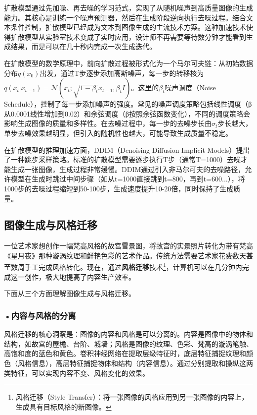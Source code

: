 扩散模型通过先加噪、再去噪的学习范式，实现了从随机噪声到高质量图像的生成能力。其核心是训练一个噪声预测器，然后在生成阶段逆向执行去噪过程。结合文本条件控制，扩散模型已经成为文本到图像生成的主流技术方案。这种加速技术使得扩散模型从实验室技术变成了实时应用，设计师不再需要等待数分钟才能看到生成结果，而是可以在几十秒内完成一次生成迭代。

在扩散模型的数学原理中，前向扩散过程被形式化为一个马尔可夫链：从初始数据分布$q(x_0)$出发，通过T步逐步添加高斯噪声，每一步的转移核为$q(x_t|x_{t-1}) = \mathcal{N}(x_t; \sqrt{1-\beta_t}x_{t-1}, \beta_t I)$。这里的$\beta_t$噪声调度（Noise Schedule），控制了每一步添加噪声的强度。常见的噪声调度策略包括线性调度（β从0.0001线性增加到0.02）和余弦调度（β按照余弦函数变化），不同的调度策略会影响生成图像的质量和多样性。在去噪过程中，每一步的去噪步长由$\sigma_t$步长越大，单步去噪效果越明显，但引入的随机性也越大，可能导致生成质量不稳定。

在扩散模型的推理加速方面，DDIM（Denoising Diffusion Implicit Models）提出了一种跳步采样策略。标准的扩散模型需要逐步执行T步（通常T=1000）去噪才能生成一张图像，生成过程非常缓慢。DDIM通过引入非马尔可夫的去噪路径，允许模型在生成时跳过中间步骤（如从t=1000直接跳到t=800，再到t=600...），将1000步的去噪过程缩短到50-100步，生成速度提升10-20倍，同时保持了生成质量。

\subsection{图像生成与风格迁移}
一位艺术家想创作一幅梵高风格的故宫雪景图，将故宫的实景照片转化为带有梵高《星月夜》那种漩涡纹理和鲜艳色彩的艺术作品。传统方法需要艺术家花费数天甚至数周手工完成风格转化。现在，通过\textbf{风格迁移}技术\footnote{风格迁移（Style Transfer）：将一张图像的风格应用到另一张图像的内容上，生成具有目标风格的新图像。}，计算机可以在几分钟内完成这一创作，极大地提高了内容生产效率。







下面从三个方面理解图像生成与风格迁移。

\subsubsection*{\textbf{•内容与风格的分离}}

风格迁移的核心洞察是：图像的内容和风格是可以分离的。内容是图像中的物体和结构，如故宫的屋檐、台阶、城墙；风格是图像的纹理、色彩、梵高的漩涡笔触、高饱和度的蓝色和黄色。卷积神经网络在提取层级特征时，底层特征捕捉纹理和颜色（风格信息），高层特征捕捉物体和结构（内容信息）。通过分别提取和操纵这两类特征，可以实现内容不变、风格变化的效果。
